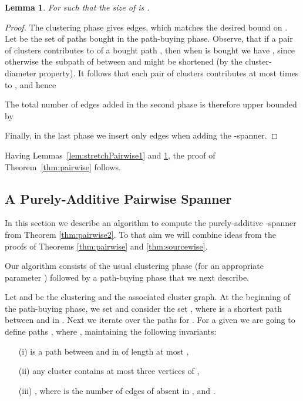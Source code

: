 \documentclass[a4paper,11pt]{article}
\newtheorem{lemma}{Lemma}[section]
\theoremstyle{definition}
\begin{document}
\begin{lemma}
\label{lem:sizePairwise1}
For  such that  the 
size of  is .
\end{lemma}

\begin{proof}
The clustering phase gives  edges, which matches the desired bound on .
Let  be the set of paths  bought in the path-buying phase.
Observe, that if a pair of clusters  contributes to  of a bought path ,
then when  is bought we have , since otherwise
the subpath of  between  and  might be shortened (by the cluster-diameter property). It follows that each pair of clusters contributes at most  times to , and hence 

The total number of edges added in the second phase is therefore upper bounded by 



Finally, in the last phase we insert only  edges when adding the -spanner.
\end{proof}

Having Lemmas~\ref{lem:stretchPairwise1} and \ref{lem:sizePairwise1}, the proof of Theorem~\ref{thm:pairwise} follows.



\subsection{A Purely-Additive Pairwise Spanner}
\label{section-pairwise-pure}

In this section we describe an algorithm to compute the purely-additive -spanner from Theorem \ref{thm:pairwise2}. To that aim we will combine ideas from the proofs of Theorems \ref{thm:pairwise} and \ref{thm:sourcewise}.

Our algorithm consists of the usual clustering phase (for an appropriate parameter ) followed by a path-buying phase that we next describe. 

Let  and  be the clustering and the associated cluster graph. At the beginning of the path-buying phase, we set  and consider the set ,
where  is a shortest path between  and  in .
Next we iterate over the paths  for .
For a given  we are going to define paths , where ,
maintaining the following invariants:\smallskip

\begin{itemize}
  \item[(i)]  is a path between  and  in  of 
  length at most ,
  \item[(ii)] any cluster  contains at most three vertices of ,
  \item[(iii)] , where  is the number of edges of  absent in ,
and .
\end{itemize}
\end{document}
